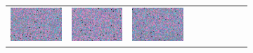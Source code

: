 \documentclass{ipol}
\begin{document}
\begin{figure}[ht]
\begin{subfigure}[t]{\linewidth}
\begin{tabular}{ccccccccc}
                \includegraphics[width=\s]{images/flowers/AHD/bid_n10_64_grids.png}&
                \includegraphics[width=\s]{images/flowers/DCB/bid_n10_64_grids.png}&
                \includegraphics[width=\s]{images/flowers/DHT/bid_n10_64_grids.png}&

\end{tabular}
\end{subfigure}
\end{figure}
\end{document}

